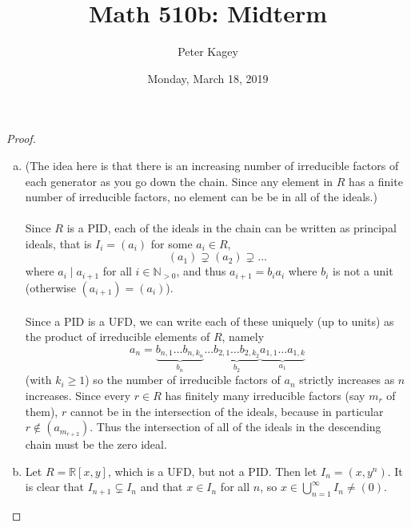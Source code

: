 \documentclass{article}
\newenvironment{problem}[2][Problem]{\begin{trivlist}
\item[\hskip \labelsep {\bfseries #1}\hskip \labelsep {\bfseries #2.}]}{\end{trivlist}}
\begin{document}
\title{Math 510b: Midterm}
\author{Peter Kagey}
\date{Monday, March 18, 2019}

\maketitle

\begin{problem}{1}
\end{problem}

\begin{proof} ~
  \begin{enumerate}[(a)]
    \item (The idea here is that there is an increasing number of irreducible
    factors of each generator as you go down the chain. Since any element in $R$
    has a finite number of irreducible factors, no element can be be in all of
    the ideals.)
    \\~\\
    Since $R$ is a PID, each of the ideals in the chain can be written as
      principal ideals, that is $I_i = (a_i)$ for some $a_i \in R$, \[
      (a_1) \supsetneq (a_2) \supsetneq \hdots
    \] where $a_i \mid a_{i+1}$ for all $i \in \mathbb N_{>0}$, and thus
    $a_{i+1} = b_i a_i$ where $b_i$ is not a unit (otherwise
    $(a_{i+1}) = (a_i)$).
    \\~\\
    Since a PID is a UFD, we can write each of these
    uniquely (up to units) as the product of irreducible elements of $R$,
    namely \[
        a_n = \underbrace{b_{n,1}\hdots b_{n,k_n}}_{b_n}
        \hdots \underbrace{b_{2,1}\hdots b_{2,k_2}}_{b_2}
        \underbrace{a_{1,1} \hdots a_{1,k}}_{a_1}
    \] (with $k_i \geq 1$) so the number of irreducible factors of $a_n$
    strictly increases as $n$ increases.
    Since every $r \in R$ has finitely many irreducible factors (say $m_r$ of
    them), $r$ cannot be in the intersection of the ideals, because in
    particular $r \not\in (a_{m_{r+2}})$. Thus the intersection of all of the
    ideals in the descending chain must be the zero ideal.
    \item Let $R = \mathbb R[x,y]$, which is a UFD, but not a PID. Then let
    $I_n = (x, y^n)$. It is clear that $I_{n+1} \subsetneq I_n$ and that
    $x \in I_n$ for all $n$, so $x \in \bigcup_{n=1}^\infty I_n \neq (0)$.
\end{enumerate}
\end{proof}
\pagebreak
\begin{problem}{2} %
\end{problem}
\end{document}
